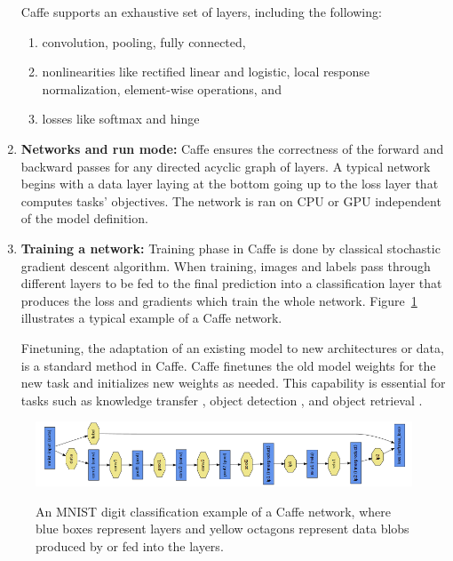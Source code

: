 \begin{enumerate}
\indent Caffe supports an exhaustive set of layers, including the following\cite{jia2014caffe}: 
\begin{enumerate}
	\item convolution, pooling, fully connected, 
	\item nonlinearities like rectified
	linear and logistic, local response normalization, element-wise operations, and 
	\item losses like softmax and hinge
\end{enumerate}
\item \textbf{Networks and run mode:} Caffe ensures the correctness of the forward and backward passes for any directed acyclic graph of layers. A typical network begins with a data layer laying at the bottom going up to the loss layer that computes tasks' objectives. The network is ran on CPU or GPU independent of the model definition. 
\item \textbf{Training a network:} Training phase in Caffe is done by classical stochastic gradient descent algorithm. When training, images and labels pass through different layers to be fed  to the final prediction into a classification layer that produces the loss and gradients which train the whole network. Figure~\ref{fig:caffe} illustrates a typical example of a Caffe network. 

\indent Finetuning, the adaptation of an existing model to new architectures or data, is a standard method in Caffe. Caffe  finetunes the old model weights for the new task and initializes new weights as needed. This capability is essential for tasks such as knowledge transfer \cite{donahue2013decaf}, object detection \cite{girshick2014rich}, and object retrieval \cite{guadarrama2014open} \cite{jia2014caffe}.  
\end{enumerate}

\begin{figure}[H]
	\centering
	{\includegraphics[width=1\textwidth]{images/caffe}}
	\caption{An MNIST digit classification example of a Caffe network, where blue boxes represent layers and yellow octagons represent data blobs produced by or fed into the layers\cite{jia2014caffe}.}
	\label{fig:caffe}
\end{figure}

